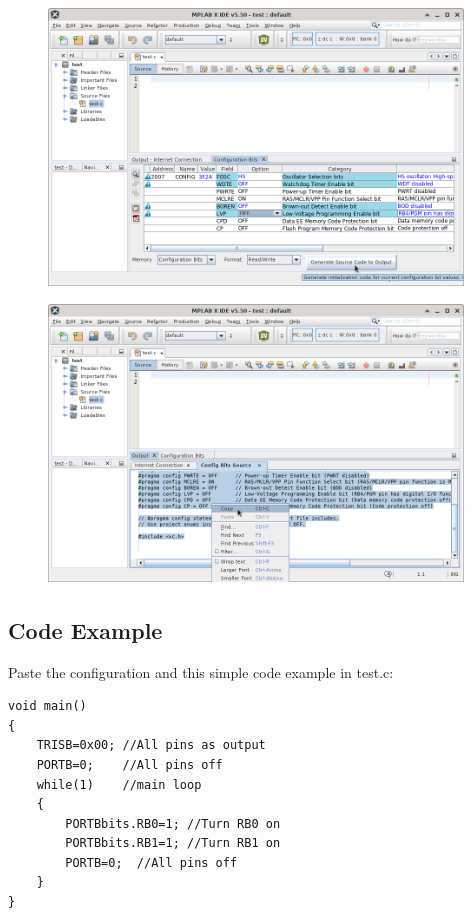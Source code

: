 \begin{figure}[H]
\center
\includegraphics[width=0.98\textwidth]{img/hmd/mplab20.png} 
\end{figure} 


\begin{figure}[H]
\center
\includegraphics[width=0.98\textwidth]{img/hmd/mplab21.png} 
\end{figure} 

\subsection{Code Example}

Paste the configuration and this simple code example in test.c:
\begin{verbatim}
void main()
{
    TRISB=0x00; //All pins as output
    PORTB=0;    //All pins off
    while(1)    //main loop
    {
        PORTBbits.RB0=1; //Turn RB0 on
        PORTBbits.RB1=1; //Turn RB1 on
        PORTB=0;  //All pins off
    }
}
\end{verbatim}


